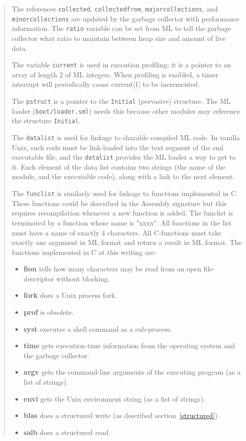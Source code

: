 \begin{quotation}
{
The references \verb"collected", \verb"collectedfrom",
\verb"majorcollections", and \verb"minorcollections" are updated by
the garbage collector with performance information.  The \verb"ratio"
variable can be set from ML to tell the garbage collector what
ratio to maintain between heap size and amount of live data.

The variable \verb"current" is used in execution profiling\cite{appel88:prof};
it is a pointer
to  an array of length 2 of ML integers.  When profiling is enabled,
a timer interrupt will periodically
cause current[1] to be incremented.

The \verb"pstruct" is a pointer to the \verb"Initial" (pervasive)
structure.  The ML loader (\verb"boot/loader.sml") needs this
because other modules may reference the structure \verb"Initial".

The \verb"datalist" is used for linkage to sharable compiled ML code.
In vanilla Unix, such code must be link-loaded into the text segment
of the sml executable file, and the \verb"datalist" provides the ML
loader a way to get to it.  Each element of the data list contains
two strings (the name of the module, and the executable code), along
with a link to the next element.

The \verb"funclist" is similarly used for linkage to functions implemented
in C.  These functions could be described in the Assembly signature
but this requires recompilation whenever a new function is added.
The funclist is terminated by a function whose name is "xxxx".  All functions
in the list must have a name of exactly 4 characters.
All C-functions must take exactly one argument in ML format and return
a result in ML format.  The functions implemented in C at this writing are:
\begin{itemize}
\item{\bf fion} tells how many characters may be read from an open
file-descriptor without blocking.
\item{\bf fork} does a Unix process fork.
\item{\bf prof} is obsolete.
\item{\bf syst} executes a shell command as a sub-process.
\item{\bf time} gets execution-time information from the operating system
and the garbage collector.
\item{\bf argv} gets the command-line arguments of the executing program
(as a list of strings).
\item{\bf envi} gets the Unix environment
string (as a list of strings).
\item{\bf blas} does a structured write (as described section~\ref{structured}).
\item{\bf salb} does a structured read.
\end{itemize}

}
\end{quotation}
